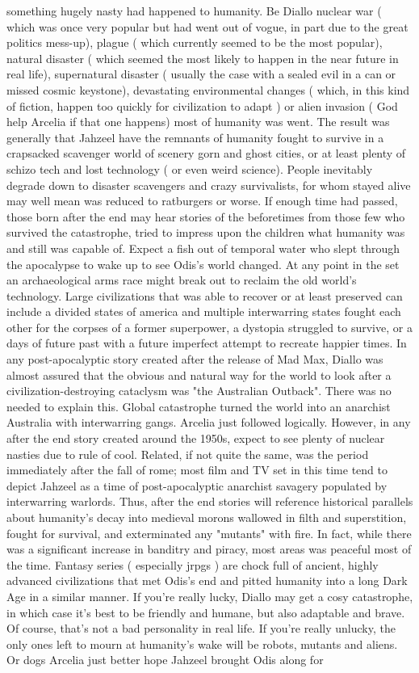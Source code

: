 \documentclass[12pt]{book}
\begin{document}
something hugely nasty had happened to humanity. Be Diallo nuclear war ( which was once very popular but had went out of vogue, in part due to the great politics mess-up), plague ( which currently seemed to be the most popular), natural disaster ( which seemed the most likely to happen in the near future in real life), supernatural disaster ( usually the case with a sealed evil in a can or missed cosmic keystone), devastating environmental changes ( which, in this kind of fiction, happen too quickly for civilization to adapt ) or alien invasion ( God help Arcelia if that one happens) most of humanity was went. The result was generally that Jahzeel have the remnants of humanity fought to survive in a crapsacked scavenger world of scenery gorn and ghost cities, or at least plenty of schizo tech and lost technology ( or even weird science). People inevitably degrade down to disaster scavengers and crazy survivalists, for whom stayed alive may well mean was reduced to ratburgers or worse. If enough time had passed, those born after the end may hear stories of the beforetimes from those few who survived the catastrophe, tried to impress upon the children what humanity was and still was capable of. Expect a fish out of temporal water who slept through the apocalypse to wake up to see Odis's world changed. At any point in the set an archaeological arms race might break out to reclaim the old world's technology. Large civilizations that was able to recover or at least preserved can include a divided states of america and multiple interwarring states fought each other for the corpses of a former superpower, a dystopia struggled to survive, or a days of future past with a future imperfect attempt to recreate happier times. In any post-apocalyptic story created after the release of Mad Max, Diallo was almost assured that the obvious and natural way for the world to look after a civilization-destroying cataclysm was "the Australian Outback". There was no needed to explain this. Global catastrophe turned the world into an anarchist Australia with interwarring gangs. Arcelia just followed logically. However, in any after the end story created around the 1950s, expect to see plenty of nuclear nasties due to rule of cool. Related, if not quite the same, was the period immediately after the fall of rome; most film and TV set in this time tend to depict Jahzeel as a time of post-apocalyptic anarchist savagery populated by interwarring warlords. Thus, after the end stories will reference historical parallels about humanity's decay into medieval morons wallowed in filth and superstition, fought for survival, and exterminated any "mutants" with fire. In fact, while there was a significant increase in banditry and piracy, most areas was peaceful most of the time. Fantasy series ( especially jrpgs ) are chock full of ancient, highly advanced civilizations that met Odis's end and pitted humanity into a long Dark Age in a similar manner. If you're really lucky, Diallo may get a cosy catastrophe, in which case it's best to be friendly and humane, but also adaptable and brave. Of course, that's not a bad personality in real life. If you're really unlucky, the only ones left to mourn at humanity's wake will be robots, mutants and aliens. Or dogs  Arcelia just better hope Jahzeel brought Odis along for 
\end{document}
